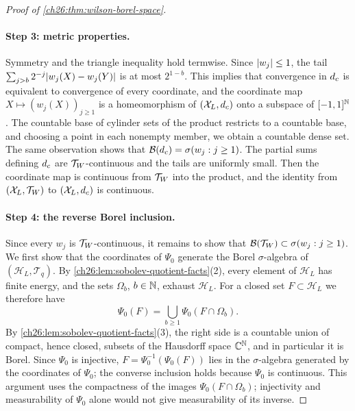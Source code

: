 \begin{proof}[Proof of \cref{ch26:thm:wilson-borel-space}]
\paragraph{Step 3: metric properties.}
Symmetry and the triangle inequality hold termwise. Since $\lvert w_j\rvert\le1$, the tail $\sum_{j>b}2^{-j}\lvert w_j(X)-w_j(Y)\rvert$ is at most $2^{1-b}$. This implies that convergence in $d_c$ is equivalent to convergence of every coordinate, and the coordinate map $X\mapsto(w_j(X))_{j\ge1}$ is a homeomorphism of $(\mathcal X_L,d_c)$ onto a subspace of $[-1,1]^{\mathbb N}$. The countable base of cylinder sets of the product restricts to a countable base, and choosing a point in each nonempty member, we obtain a countable dense set. The same observation shows that $\mathcal B(d_c)=\sigma(w_j:j\ge1)$. The partial sums defining $d_c$ are $\mathcal T_W$-continuous and the tails are uniformly small. Then the coordinate map is continuous from $\mathcal T_W$ into the product, and the identity from $(\mathcal X_L,\mathcal T_W)$ to $(\mathcal X_L,d_c)$ is continuous.

\paragraph{Step 4: the reverse Borel inclusion.}
Since every $w_j$ is $\mathcal T_W$-continuous, it remains to show that $\mathcal B(\mathcal T_W)\subset\sigma(w_j:j\ge1)$. We first show that the coordinates of $\Psi_0$ generate the Borel $\sigma$-algebra of $(\mathcal H_L,\mathcal T_q)$. By \cref{ch26:lem:sobolev-quotient-facts}(2), every element of $\mathcal H_L$ has finite energy, and the sets $\Omega_b$, $b\in\mathbb N$, exhaust $\mathcal H_L$. For a closed set $F\subset\mathcal H_L$ we therefore have
\begin{equation}\label{ch26:eq:closed-energy-image}
 \Psi_0(F)=\bigcup_{b\ge1}\Psi_0(F\cap\Omega_b).
\end{equation}
By \cref{ch26:lem:sobolev-quotient-facts}(3), the right side is a countable union of compact, hence closed, subsets of the Hausdorff space $\mathbb C^{\mathbb N}$, and in particular it is Borel. Since $\Psi_0$ is injective, $F=\Psi_0^{-1}(\Psi_0(F))$ lies in the $\sigma$-algebra generated by the coordinates of $\Psi_0$; the converse inclusion holds because $\Psi_0$ is continuous. This argument uses the compactness of the images $\Psi_0(F\cap\Omega_b)$; injectivity and measurability of $\Psi_0$ alone would not give measurability of its inverse.


\end{proof}
